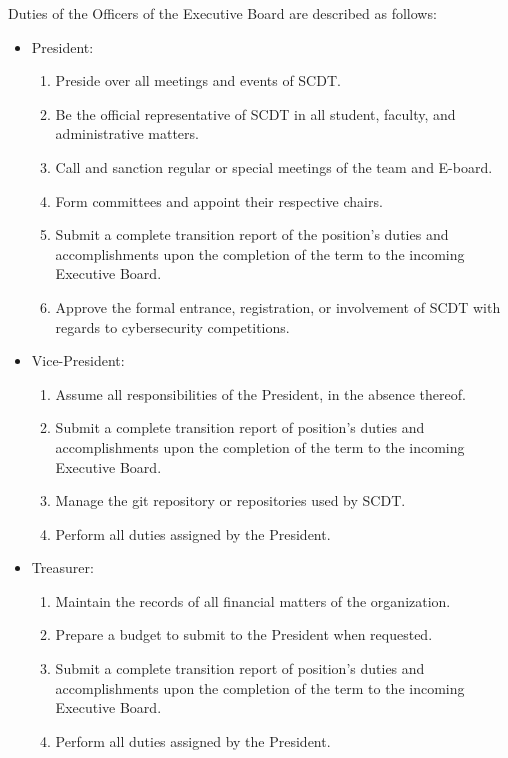 \documentclass[12pt]{constitution}
\begin{document}
Duties of the Officers of the Executive Board are described as follows:

\begin{itemize}
    \item President:
        \begin{enumerate}
            \item Preside over all meetings and events of SCDT.
            \item Be the official representative of SCDT in all student,
            faculty, and administrative matters. 
            \item Call and sanction regular or special meetings of the team and
            E-board.
            \item Form committees and appoint their respective chairs. 
            \item Submit a complete transition report of the position’s duties
            and accomplishments upon the completion of the term to the incoming
            Executive Board.
            \item Approve the formal entrance, registration, or involvement of
            SCDT with regards to cybersecurity competitions.
        \end{enumerate}

    \item Vice-President:
        \begin{enumerate}
            \item Assume all responsibilities of the President, in the absence
            thereof.
            \item Submit a complete transition report of position’s duties and
            accomplishments upon the completion of the term to the incoming
            Executive Board.
            \item Manage the git repository or repositories used by SCDT.
            \item Perform all duties assigned by the President.
        \end{enumerate}

    \item Treasurer:
        \begin{enumerate}
            \item Maintain the records of all financial matters of the
            organization.
            \item Prepare a budget to submit to the President when requested.
            \item Submit a complete transition report of position’s duties and
            accomplishments upon the completion of the term to the incoming
            Executive Board.
            \item Perform all duties assigned by the President.
        \end{enumerate}


\end{itemize}
\end{document}
